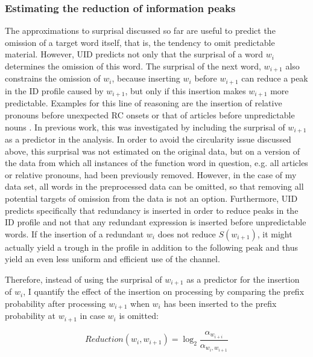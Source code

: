 \subsubsection{Estimating the reduction of information peaks}
The approximations to surprisal discussed so far are useful to predict the omission of a target word itself, that is, the tendency to omit predictable material. However, UID predicts not only that the surprisal of a word $w_i$ determines the omission of this word. The surprisal of the next word, $w_{i+1}$ also constrains the omission of $w_i$, because inserting $w_i$ before $w_{i+1}$ can reduce a peak in the ID profile caused by $w_{i+1}$, but only if this insertion makes $w_{i+1}$ more predictable. Examples for this line of reasoning are the insertion of relative pronouns before unexpected RC onsets \citep{levy.jaeger2007} or that of articles before unpredictable nouns \citep{lemke.etal2017}. In previous work, this was investigated by including the surprisal of $w_{i+1}$ as a predictor in the analysis. In order to avoid the circularity issue discussed above, this surprisal was not estimated on the original data, but on a version of the data from which all instances of the function word in question, e.g. all articles or relative pronouns, had been previously removed. However, in the case of my data set, all words in the preprocessed data can be omitted, so that removing all potential targets of omission from the data is not an option. Furthermore, UID predicts specifically that redundancy is inserted in order to reduce peaks in the ID profile and not that any redundant expression is inserted before unpredictable words. If the insertion of a redundant $w_i$ does not reduce $S(w_{i+1})$, it might actually yield a trough in the profile in addition to the following peak and thus yield an even less uniform and efficient use of the channel.

Therefore, instead of using the surprisal of $w_{i+1}$ as a predictor for the insertion of $w_i$, I quantify the effect of the insertion on processing by comparing the prefix probability after processing $w_{i+1}$ when $w_i$ has been inserted to the prefix probability at $w_{i+1}$ in case $w_i$ is omitted:

\begin{equation} 
 \displaystyle Reduction(w_i, w_{i+1}) = \log_2 \frac{\alpha_{w_{i+i}}}{\alpha_{w_i, w_{i+1}}} \label{eq:sreduction}
\end{equation}

